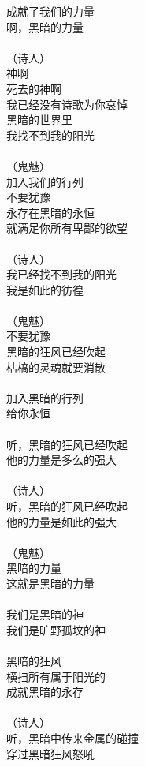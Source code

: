 成就了我们的力量\\
啊，黑暗的力量\\
\\
（诗人）\\
神啊\\
死去的神啊\\
我已经没有诗歌为你哀悼\\
黑暗的世界里\\
我找不到我的阳光\\
\\
（鬼魅）\\
加入我们的行列\\
不要犹豫\\
永存在黑暗的永恒\\
就满足你所有卑鄙的欲望\\
\\
（诗人）\\
我已经找不到我的阳光\\
我是如此的彷徨\\
\\
（鬼魅）\\
不要犹豫\\
黑暗的狂风已经吹起\\
枯槁的灵魂就要消散\\
\\
加入黑暗的行列\\
给你永恒\\
\\
听，黑暗的狂风已经吹起\\
他的力量是多么的强大\\
\\
（诗人）\\
听，黑暗的狂风已经吹起\\
他的力量是如此的强大\\
\\
（鬼魅）\\
黑暗的力量\\
这就是黑暗的力量\\
\\
我们是黑暗的神\\
我们是旷野孤坟的神\\
\\
黑暗的狂风\\
横扫所有属于阳光的\\
成就黑暗的永存\\
\\
（诗人）\\
听，黑暗中传来金属的碰撞\\
穿过黑暗狂风怒吼\\
